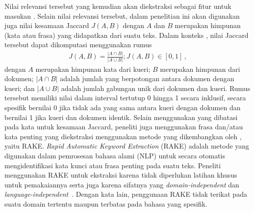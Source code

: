 Nilai relevansi tersebut yang kemudian akan diekstraksi sebagai fitur untuk masukan \reranker{}. Selain nilai relevansi tersebut, dalam penelitian ini akan digunakan juga nilai kesamaan Jaccard \(J(A,B)\) dengan \(A\) dan \(B\) merupakan himpunan \term{} (kata atau frasa) yang didapatkan dari suatu teks. Dalam konteks \ir{}, nilai Jaccard tersebut dapat dikomputasi menggunakan rumus
\begin{align*}
    J(A,B)=\frac{|A\cap{}B|}{|A\cup{}B|};J(A,B)\in{}[0,1] \, ,
\end{align*}
dengan \(A\) merupakan himpunan kata \term{} dari kueri; \(B\) merupakan himpunan \term{} dari dokumen; \(|A\cap{}B|\) adalah jumlah \term{} yang berpotongan antara dokumen dengan kueri; dan \(|A\cup{}B|\) adalah jumlah gabungan \term{} unik dari dokumen dan kueri. Rumus tersebut memiliki nilai dalam interval tertutup 0 hingga 1 secara inklusif, secara spesifik bernilai 0 jika tidak ada \term{} yang sama antara kueri dengan dokumen dan bernilai 1 jika \term{} kueri dan \term{} dokumen identik. Selain menggunakan \term{} yang dibatasi pada kata untuk kesamaan Jaccard, peneliti juga menggunakan frasa dan/atau kata penting yang diekstraksi menggunakan metode yang dikembangkan oleh \citet{rose2010automatic}, yaitu RAKE. \textit{Rapid Automatic Keyword Extraction} (RAKE) adalah metode yang digunakan dalam pemrosesan bahasa alami (NLP) untuk secara otomatis mengidentifikasi kata kunci atau frasa penting pada suatu teks. Peneliti menggunakan RAKE untuk ekstraksi karena tidak diperlukan latihan khusus untuk pemakaiannya serta juga karena sifatnya yang \textit{domain-independent} dan \textit{language-independent}~\citep{rose2010automatic}. Dengan kata lain, penggunaan RAKE tidak terikat pada suatu domain tertentu maupun terbatas pada bahasa yang spesifik.

